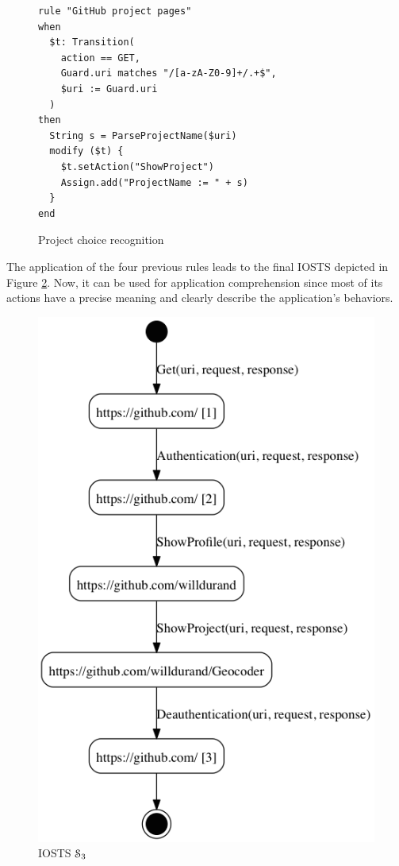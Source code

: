 \begin{figure}
\begin{framed}
\begin{BVerbatim}
rule "GitHub project pages"
when
  $t: Transition(
    action == GET,
    Guard.uri matches "/[a-zA-Z0-9]+/.+$",
    $uri := Guard.uri
  )
then
  String s = ParseProjectName($uri)
  modify ($t) {
    $t.setAction("ShowProject")
    Assign.add("ProjectName := " + s)
  }
end
\end{BVerbatim}
\end{framed}

\caption{Project choice recognition}
\label{fig:rule:gh-project}
\end{figure}

\begin{example}
The application of the four previous rules leads to the final
IOSTS depicted in Figure \ref{fig:github:iosts:4}. Now, it can be
used for application comprehension since most of its actions have
a precise meaning and clearly describe the application's
behaviors.
\end{example}

\begin{figure}[ht]
    \begin{center}
    \includegraphics[width=0.6\linewidth]{figures/gh-iosts-41.png}
    \caption {IOSTS $\EuScript{S}_3$}
    \label{fig:github:iosts:4}
    \end{center}
\end{figure}

